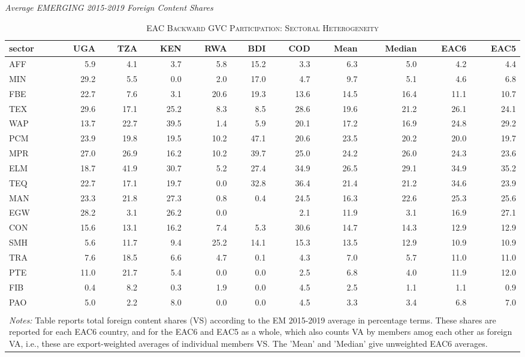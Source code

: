 \documentclass[a4paper]{article}
\begin{document}
\begin{table}[ht] \vspace{-2mm}
\centering
\caption{\label{tab:EACVB_sec}\textsc{EAC Backward GVC Participation: Sectoral Heterogeneity}}
\small{\textit{Average EMERGING 2015-2019 Foreign Content Shares}} \\
\vspace{1mm}
\begin{tabular}{lrrrrrrrrrr}
  \toprule
sector & UGA & TZA & KEN & RWA & BDI & COD & Mean & Median & EAC6 & EAC5 \\ 
  \midrule
AFF & 5.9 & 4.1 & 3.7 & 5.8 & 15.2 & 3.3 & 6.3 & 5.0 & 4.2 & 4.4\\ 
  MIN & 29.2 & 5.5 & 0.0 & 2.0 & 17.0 & 4.7 & 9.7 & 5.1 & 4.6 & 6.8\\ 
  FBE & 22.7 & 7.6 & 3.1 & 20.6 & 19.3 & 13.6 & 14.5 & 16.4 & 11.1 & 10.7\\ 
  TEX & 29.6 & 17.1 & 25.2 & 8.3 & 8.5 & 28.6 & 19.6 & 21.2 & 26.1 & 24.1\\ 
  WAP & 13.7 & 22.7 & 39.5 & 1.4 & 5.9 & 20.1 & 17.2 & 16.9 & 24.8 & 29.2\\ 
  PCM & 23.9 & 19.8 & 19.5 & 10.2 & 47.1 & 20.6 & 23.5 & 20.2 & 20.0 & 19.7\\ 
  MPR & 27.0 & 26.9 & 16.2 & 10.2 & 39.7 & 25.0 & 24.2 & 26.0 & 24.3 & 23.6\\ 
  ELM & 18.7 & 41.9 & 30.7 & 5.2 & 27.4 & 34.9 & 26.5 & 29.1 & 34.9 & 35.2\\ 
  TEQ & 22.7 & 17.1 & 19.7 & 0.0 & 32.8 & 36.4 & 21.4 & 21.2 & 34.6 & 23.9\\ 
  MAN & 23.3 & 21.8 & 27.3 & 0.8 & 0.4 & 24.5 & 16.3 & 22.6 & 25.3 & 25.6\\ 
  EGW & 28.2 & 3.1 & 26.2 & 0.0 &  & 2.1 & 11.9 & 3.1 & 16.9 & 27.1\\ 
  CON & 15.6 & 13.1 & 16.2 & 7.4 & 5.3 & 30.6 & 14.7 & 14.3 & 12.9 & 12.9\\ 
  SMH & 5.6 & 11.7 & 9.4 & 25.2 & 14.1 & 15.3 & 13.5 & 12.9 & 10.9 & 10.9\\ 
  TRA & 7.6 & 18.5 & 6.6 & 4.7 & 0.1 & 4.3 & 7.0 & 5.7 & 11.0 & 11.0\\ 
  PTE & 11.0 & 21.7 & 5.4 & 0.0 & 0.0 & 2.5 & 6.8 & 4.0 & 11.9 & 12.0\\ 
  FIB & 0.4 & 8.2 & 0.3 & 1.9 & 0.0 & 4.5 & 2.5 & 1.1 & 1.1 & 0.9\\ 
  PAO & 5.0 & 2.2 & 8.0 & 0.0 & 0.0 & 4.5 & 3.3 & 3.4 & 6.8 & 7.0\\ 
   \bottomrule  \\ [-0.9em]
\multicolumn{11}{l}{\parbox{0.85\textwidth}{\scriptsize
\textit{Notes:} Table reports total foreign content shares (VS) according to the EM 2015-2019 average in percentage terms. These shares are reported for each EAC6 country, and for the EAC6 and EAC5 as a whole, which also counts VA by members amog each other as foreign VA, i.e., these are export-weighted averages of individual members VS. The 'Mean' and 'Median' give unweighted EAC6 averages.}}
\end{tabular}
\end{table}
\end{document}
